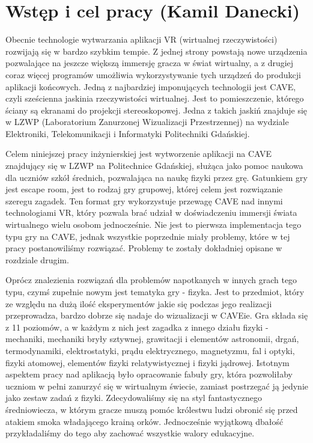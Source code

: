 \chapter{Wstęp i cel pracy (Kamil Danecki)}
\label{chap:introduction}

Obecnie technologie wytwarzania aplikacji VR (wirtualnej rzeczywistości) rozwijają się w bardzo szybkim tempie. 
Z jednej strony powstają nowe urządzenia pozwalające na jeszcze większą immersję gracza w świat wirtualny, a z drugiej coraz więcej programów umożliwia wykorzystywanie tych urządzeń do produkcji aplikacji końcowych.
Jedną z najbardziej imponujących technologii jest CAVE, czyli sześcienna jaskinia rzeczywistości wirtualnej. 
Jest to pomieszczenie, którego ściany są ekranami do projekcji stereoskopowej. 
Jedna z takich jaskiń znajduje się w LZWP (Laboratorium Zanurzonej Wizualizacji Przestrzennej) na wydziale Elektroniki, Telekomunikacji i Informatyki Politechniki Gdańskiej.

Celem niniejszej pracy inżynierskiej jest wytworzenie aplikacji na CAVE znajdujący się w LZWP na Politechnice Gdańskiej, służąca jako pomoc naukowa dla uczniów szkół średnich, pozwalająca na naukę fizyki przez grę. 
Gatunkiem gry jest escape room, jest to rodzaj gry grupowej, której celem jest rozwiązanie szeregu zagadek.
Ten format gry wykorzystuje przewagę CAVE nad innymi technologiami VR, który pozwala brać udział w doświadczeniu immersji świata wirtualnego wielu osobom jednocześnie. 
Nie jest to pierwsza implementacja tego typu gry na CAVE, jednak wszystkie poprzednie miały problemy, które w tej pracy postanowiliśmy rozwiązać. 
Problemy te zostały dokładniej opisane w rozdziale drugim.

Oprócz znalezienia rozwiązań dla problemów napotkanych w innych grach tego typu, czymś zupełnie nowym jest tematyka gry - fizyka. Jest to przedmiot, który ze względu na dużą ilość eksperymentów jakie się podczas jego realizacji przeprowadza, bardzo dobrze się nadaje do wizualizacji w CAVEie.
Gra składa się z 11 poziomów, a w każdym z nich jest zagadka z innego działu fizyki - mechaniki, mechaniki bryły sztywnej, grawitacji i elementów astronomii, drgań, termodynamiki, elektrostatyki, prądu elektrycznego, magnetyzmu, fal i optyki, fizyki atomowej, elementów fizyki relatywistycznej i fizyki jądrowej. 
Istotnym aspektem pracy nad aplikacją było opracowanie fabuły gry, która pozwoliłaby uczniom w pełni zanurzyć się w wirtualnym świecie, zamiast postrzegać ją jedynie jako zestaw zadań z fizyki.
Zdecydowaliśmy się na styl fantastycznego średniowiecza, w którym gracze muszą pomóc królestwu ludzi obronić się przed atakiem smoka władającego krainą orków.
Jednocześnie wyjątkową dbałość przykładaliśmy do tego aby zachować wszystkie walory edukacyjne.

